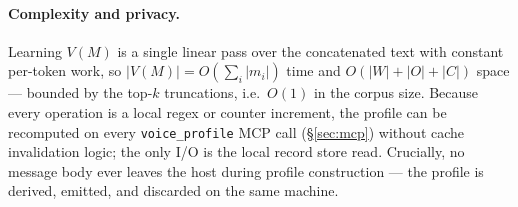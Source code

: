 \paragraph{Complexity and privacy.}
Learning $V(M)$ is a single linear pass over the concatenated text with
constant per-token work, so $|V(M)| = O(\sum_i |m_i|)$ time and
$O(|W| + |O| + |C|)$ space --- bounded by the top-$k$ truncations, i.e.\
$O(1)$ in the corpus size. Because every operation is a local regex or
counter increment, the profile can be recomputed on every
\texttt{voice\_profile} MCP call (\S\ref{sec:mcp}) without cache
invalidation logic; the only I/O is the local record store read.
Crucially, no message body ever leaves the host during profile
construction --- the profile is derived, emitted, and discarded on the
same machine.
